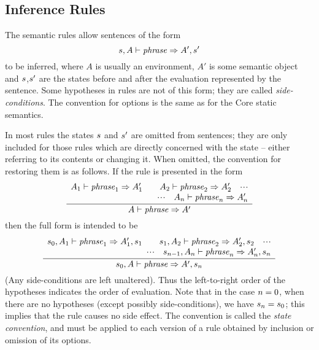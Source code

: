 \subsection{Inference Rules}
\label{dyncor-inf-rules-sec}
The semantic rules allow sentences  of the form
\[ s,A\vdash{\it phrase}\Rightarrow A',s' \]
to be inferred, where $A$ is usually an environment, $A'$ is some semantic
object and $s$,$s'$ are the states before and after the evaluation
represented by the sentence.  Some hypotheses in rules are not of this form;
they are called {\sl side-conditions}.  The convention for options is
the same as for the Core static semantics.  

In most rules the states $s$ and $s'$ are omitted from sentences; they
are only included for those rules which are directly concerned with the state
-- either referring to its contents or changing it.  When omitted, the
convention for restoring them is as follows.  If the rule is presented in the
form
\[ \frac{ \begin{array}{r}
          A_1\vdash{\it phrase}_1\Rightarrow A_1'\qquad
          A_2\vdash{\it phrase}_2\Rightarrow A_2'\quad\mbox{$\cdot\!\cdot\!\cdot$}\\
          \mbox{$\cdot\!\cdot\!\cdot$}\quad A_n\vdash{\it phrase}_n\Rightarrow A_n'
          \end{array}
        }
        { A\vdash{\it phrase}\Rightarrow A'} \]
\oldpagebreak
then the full form is intended to be
\[ \frac{ \begin{array}{r}
          s_0,A_1\vdash{\it phrase}_1\Rightarrow A_1',s_1\qquad
          s_1,A_2\vdash{\it phrase}_2\Rightarrow A_2',s_2\quad\mbox{$\cdot\!\cdot\!\cdot$}\\
          \mbox{$\cdot\!\cdot\!\cdot$}\quad s_{n-1},A_n\vdash{\it phrase}_n\Rightarrow A_n',s_n
          \end{array}
        }
        { s_0,A\vdash{\it phrase}\Rightarrow A',s_n} \]
(Any side-conditions are left unaltered).
Thus the left-to-right order of the hypotheses indicates the order of
evaluation.  Note that in the case $n=0$, when there are no hypotheses
(except possibly side-conditions), we have $s_n=s_0$; this implies that the
rule causes no side effect.
The convention is called the {\sl state convention}, and
must be applied to each version of a rule obtained by inclusion or
omission of its options.

